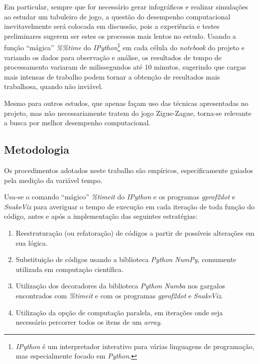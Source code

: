 \documentclass[12pt]{article}
\newcommand{\aspas}[1]{``#1''} %
\begin{document}
Em particular, sempre que for necessário gerar infográficos e realizar simulações ao estudar um tabuleiro de jogo, a questão do desempenho computacional inevitavelmente será colocada em discussão, pois a experiência e testes preliminares sugerem ser estes os processos mais lentos no estudo. Usando a função \aspas{mágica} \textit{\%\%time} do \textit{IPython}\footnote{\textit{IPython} é um interpretador interativo para várias linguagens de programação, mas especialmente focado em \textit{Python}.} em cada célula do \textit{notebook} do projeto e variando os dados para observação e análise, os resultados de tempo de processamento variaram de milissegundos até 10 minutos, sugerindo que cargas mais intensas de trabalho podem tornar a obtenção de resultados mais trabalhosa, quando não inviável. 

Mesmo para outros estudos, que apenas façam uso das técnicas apresentadas no projeto, mas não necessariamente tratem do jogo Zigue-Zague, torna-se relevante a busca por melhor desempenho computacional.

\subsection{Metodologia}
\label{metodologia}

Os procedimentos adotados neste trabalho são empíricos, especificamente guiados pela medição da variável tempo.

Usa-se o comando \aspas{mágico} \textit{\%timeit} do \textit{IPython} e os programas \textit{gprof2dot} e \textit{SnakeViz} para averiguar o tempo de execução em cada iteração de toda função do código, antes e após a implementação das seguintes estratégias:

\begin{enumerate}
	\item \label{reestruturacao} Reestruturação (ou refatoração) de códigos a partir de possíveis alterações em sua lógica.
	
	\item \label{substituicao} Substituição de códigos usando a biblioteca \textit{Python} \textit{NumPy}, comumente utilizada em computação científica.
	
	\item \label{decoradores} Utilização dos decoradores da biblioteca \textit{Python} \textit{Numba} nos gargalos encontrados com \textit{\%timeit} e com os programas \textit{gprof2dot} e \textit{SnakeViz}.
	
	\item \label{paralela} Utilização da opção de computação paralela, em iterações onde seja necessário percorrer todos os itens de um \textit{array}.
\end{enumerate}
\end{document}
